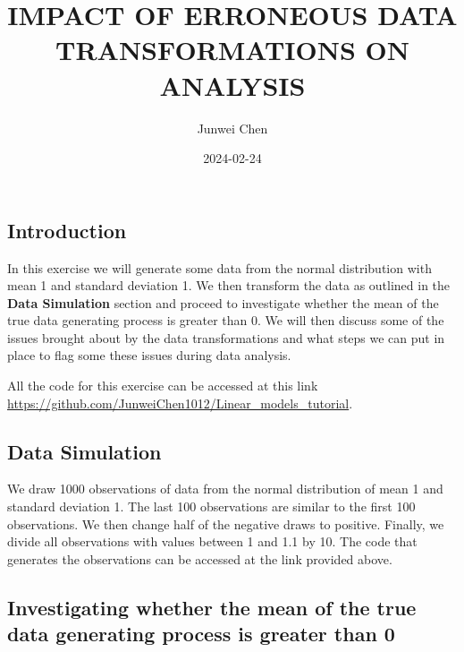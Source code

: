 \documentclass[
  letterpaper,
  DIV=11,
  numbers=noendperiod]{scrartcl}
\title{IMPACT OF ERRONEOUS DATA TRANSFORMATIONS ON ANALYSIS}
\author{Junwei Chen}
\date{2024-02-24}
\begin{document}
\maketitle
\ifdefined\Shaded\renewenvironment{Shaded}{\begin{tcolorbox}[enhanced, sharp corners, interior hidden, borderline west={3pt}{0pt}{shadecolor}, breakable, boxrule=0pt, frame hidden]}{\end{tcolorbox}}\fi

\hypertarget{introduction}{%
\subsection{Introduction}\label{introduction}}

In this exercise we will generate some data from the normal distribution
with mean 1 and standard deviation 1. We then transform the data as
outlined in the \textbf{Data Simulation} section and proceed to
investigate whether the mean of the true data generating process is
greater than 0. We will then discuss some of the issues brought about by
the data transformations and what steps we can put in place to flag some
these issues during data analysis.

All the code for this exercise can be accessed at this link
\url{https://github.com/JunweiChen1012/Linear_models_tutorial}.

\hypertarget{data-simulation}{%
\subsection{Data Simulation}\label{data-simulation}}

We draw 1000 observations of data from the normal distribution of mean 1
and standard deviation 1. The last 100 observations are similar to the
first 100 observations. We then change half of the negative draws to
positive. Finally, we divide all observations with values between 1 and
1.1 by 10. The code that generates the observations can be accessed at
the link provided above.

\hypertarget{investigating-whether-the-mean-of-the-true-data-generating-process-is-greater-than-0}{%
\subsection{Investigating whether the mean of the true data generating
process is greater than
0}\label{investigating-whether-the-mean-of-the-true-data-generating-process-is-greater-than-0}}
\end{document}

